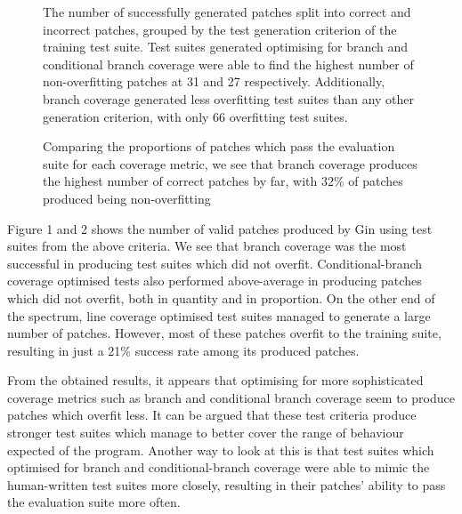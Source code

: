 \documentclass[titlepage]{article}
\begin{document}
\begin{figure}
    \begin{center}
        \resizebox{0.8\textwidth}{!}{}
    \end{center}
    \caption{The number of successfully generated patches split into correct and incorrect patches, grouped by the test generation criterion of the training test suite. Test suites generated optimising for branch and conditional branch coverage were able to find the highest number of non-overfitting patches at 31 and 27 respectively. Additionally, branch coverage generated less overfitting test suites than any other generation criterion, with only 66 overfitting test suites.}
\end{figure}


\begin{figure}
    \begin{center}
        \resizebox{0.8\textwidth}{!}{}
    \end{center}
    \caption{Comparing the proportions of patches which pass the evaluation suite for each coverage metric, we see that branch coverage produces the highest number of correct patches by far, with 32\% of patches produced being non-overfitting}
\end{figure}

Figure 1 and 2 shows the number of valid patches produced by Gin using test suites from the above criteria. We see that branch coverage was the most successful in producing test suites which did not overfit. Conditional-branch coverage optimised tests also performed above-average in producing patches which did not overfit, both in quantity and in proportion. On the other end of the spectrum, line coverage optimised test suites managed to generate a large number of patches. However, most of these patches overfit to the training suite, resulting in just a 21\% success rate among its produced patches.

From the obtained results, it appears that optimising for more sophisticated coverage metrics such as branch and conditional branch coverage seem to produce patches which overfit less. It can be argued that these test criteria produce stronger test suites which manage to better cover the range of behaviour expected of the program. Another way to look at this is that test suites which optimised for branch and conditional-branch coverage were able to mimic the human-written test suites more closely, resulting in their patches’ ability to pass the evaluation suite more often. 
\end{document}
